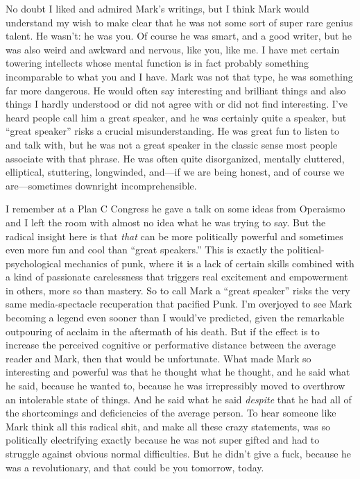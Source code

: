 \documentclass[a4paper,12pt,margin=.5in]{article}
\begin{document}
No doubt I liked and admired Mark's writings, but I think Mark would
understand my wish to make clear that he was not some sort of super rare
genius talent. He wasn't: he was you. Of course he was smart, and a good
writer, but he was also weird and awkward and nervous, like you, like
me. I have met certain towering intellects whose mental function is in
fact probably something incomparable to what you and I have. Mark was
not that type, he was something far more dangerous. He would often say
interesting and brilliant things and also things I hardly understood or
did not agree with or did not find interesting. I've heard people call
him a great speaker, and he was certainly quite a speaker, but ``great
speaker'' risks a crucial misunderstanding. He was great fun to listen
to and talk with, but he was not a great speaker in the classic sense
most people associate with that phrase. He was often quite disorganized,
mentally cluttered, elliptical, stuttering, longwinded, and---if we are
being honest, and of course we are---sometimes downright
incomprehensible.

I remember at a Plan C Congress he gave a talk on some ideas from
Operaismo and I left the room with almost no idea what he was trying to
say. But the radical insight here is that \emph{that} can be more
politically powerful and sometimes even more fun and cool than ``great
speakers.'' This is exactly the political-psychological mechanics of
punk, where it is a lack of certain skills combined with a kind of
passionate carelessness that triggers real excitement and empowerment in
others, more so than mastery. So to call Mark a ``great speaker'' risks
the very same media-spectacle recuperation that pacified Punk. I'm
overjoyed to see Mark becoming a legend even sooner than I would've
predicted, given the remarkable outpouring of acclaim in the aftermath
of his death. But if the effect is to increase the perceived cognitive
or performative distance between the average reader and Mark, then that
would be unfortunate. What made Mark so interesting and powerful was
that he thought what he thought, and he said what he said, because he
wanted to, because he was irrepressibly moved to overthrow an
intolerable state of things. And he said what he said \emph{despite}
that he had all of the shortcomings and deficiencies of the average
person. To hear someone like Mark think all this radical shit, and make
all these crazy statements, was so politically electrifying exactly
because he was not super gifted and had to struggle against obvious
normal difficulties. But he didn't give a fuck, because he was a
revolutionary, and that could be you tomorrow, today.
\end{document}
